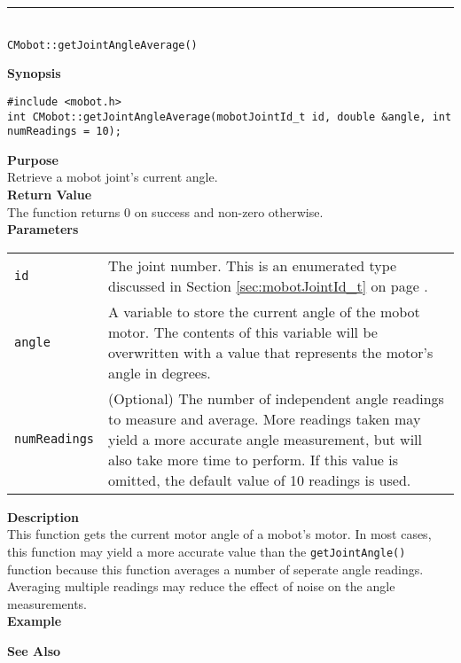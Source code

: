 \noindent
\vspace{5pt}
\rule{4.5in}{0.015in}\\
\noindent
{\LARGE \texttt{CMobot::getJointAngleAverage()}}\\
{}

\noindent
{\bf Synopsis}
\vspace{-8pt}
\begin{verbatim}
#include <mobot.h>
int CMobot::getJointAngleAverage(mobotJointId_t id, double &angle, int numReadings = 10);
\end{verbatim}

\noindent
{\bf Purpose}\\
Retrieve a mobot joint's current angle.\\

\noindent
{\bf Return Value}\\
The function returns 0 on success and non-zero otherwise.\\

\noindent
{\bf Parameters}\\
\vspace{-0.1in}
\begin{description}
\item               
\begin{tabular}{p{15 mm}p{145 mm}}
\texttt{id} & The joint number. This is an enumerated type 
discussed in Section \ref{sec:mobotJointId_t} on page
\pageref{sec:mobotJointId_t}.\\
\texttt{angle} & A variable to store the current angle of the mobot
motor. The contents of this variable will be overwritten with a value that
represents the motor's angle in degrees.  \\
\texttt{numReadings} & (Optional) The number of independent angle readings to measure 
and average. More readings taken may yield a more accurate angle measurement, but will also
take more time to perform. If this value is omitted, the default value of 10 readings is
used.
\end{tabular}
\end{description}

\noindent
{\bf Description}\\
This function gets the current motor angle of a mobot's motor. In most cases, this
function may yield a more accurate value than the \texttt{getJointAngle()} function
because this function averages a number of seperate angle readings. Averaging multiple 
readings may reduce the effect of noise on the angle measurements.
\\




\noindent
{\bf Example}\\
\noindent

\noindent
{\bf See Also}\\

